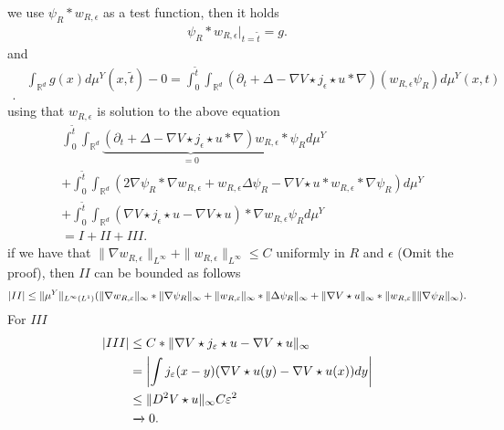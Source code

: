 we use $\psi_R * w_{R,\epsilon}$ as a test function, then it holds
\begin{align*}
  \psi_{R}*w_{R,\epsilon} \rvert_{t = \tilde{t} } = g
.\end{align*}
and 
\begin{align*}
  &\int_{\mathbb{R}^{d} } g(x)d\mu^{Y}(x,\tilde{t} ) - 0 = \int_0^{\tilde{t} } \int_{\mathbb{R}^{d} }  (\partial_t  + \Delta -  \nabla V \star  j_{\epsilon} \star u * \nabla)(w_{R,\epsilon} \psi_R) d\mu^Y(x,t)\\
.\end{align*}
using that $w_{R,\epsilon}$ is solution to the above equation 
\begin{align*}
  &\int_{0}^{\tilde{t} } \int_{\mathbb{R}^{d} } \underbrace{(\partial_t  + \Delta -  \nabla V \star j_{\epsilon} \star u * \nabla) w_{R,\epsilon}}_{=0}*\psi_{R} d\mu^Y \\
  &+  \int_0^{\tilde{t} } \int_{\mathbb{R}^{d} } (2 \nabla \psi_R * \nabla w_{R,\epsilon} + w_{R,\epsilon} \Delta \psi_{R} - \nabla V \star  u *w_{R,\epsilon}*\nabla \psi_{R}) d\mu^Y \\
  &+ \int_0^{\tilde{t} } \int_{\mathbb{R}^{d} }  (\nabla V \star  j_{\epsilon} \star  u - \nabla V \star  u) * \nabla w_{R,\epsilon}\psi_{R} d\mu^Y\\
  &= I + II + III
.\end{align*}
if we have that $\|\nabla w_{R,\epsilon}\|_{L^{\infty} } + \|w_{R,\epsilon}\|_{L^{\infty} } \le  C$ uniformly in $R$ and $\epsilon$ (Omit the proof),
then $II$ can be bounded as follows
\begin{align*}
  \abs{II}\le \|\mu^Y\|_{L^{\infty}(L^{1} ) } (\|\nabla w_{R,\epsilon}\|_{\infty}*\|\nabla \psi_R\|_{\infty}+\|w_{R,\epsilon}\|_{\infty}*\|\Delta  \psi_R\|_{\infty} +\|\nabla V \star  u\|_{\infty} * \|w_{R,\epsilon}\|\|\nabla \psi_R\|_{\infty})
.\end{align*}
For $III$ 
\begin{align*}
  \abs{III}&\le C*\|\nabla V \star  j_{\epsilon} \star u - \nabla V \star  u \|_{\infty} \\
           &= \abs*{\int j_{\epsilon}(x-y)(\nabla V \star  u (y) - \nabla V \star  u(x)) dy}\\
           &\le  \|D^2 V \star  u \|_{\infty} C \epsilon ^2 \\
           &\xrightarrow{} 0
.\end{align*}
